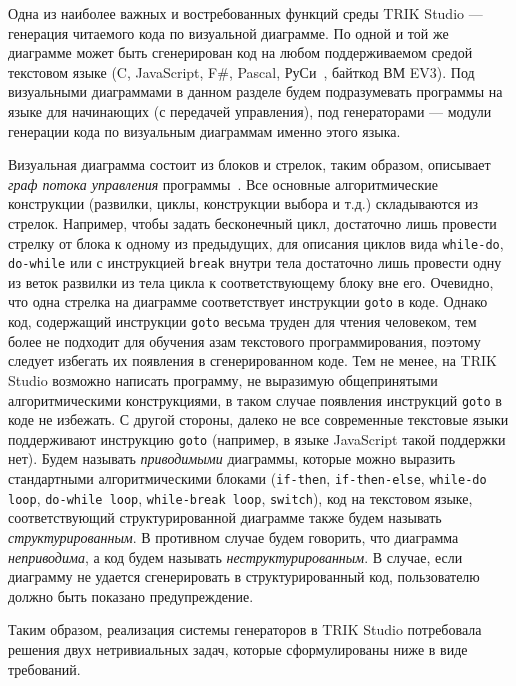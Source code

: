 \documentclass[a5paper]{article}
\begin{document}
Одна из наиболее важных и востребованных функций среды TRIK Studio --- генерация читаемого кода по визуальной диаграмме. По одной и той же диаграмме может быть сгенерирован код на любом поддерживаемом средой текстовом языке (C, JavaScript, F\#, Pascal, РуСи~\cite{тереховотечественные}, байткод ВМ EV3). Под визуальными диаграммами в данном разделе будем подразумевать программы на языке для начинающих (с передачей управления), под генераторами --- модули генерации кода по визуальным диаграммам именно этого языка.

Визуальная диаграмма состоит из блоков и стрелок, таким образом, описывает \textit{граф потока управления} программы~\cite{steven1997advanced}. Все основные алгоритмические конструкции (развилки, циклы, конструкции выбора и т.д.) складываются из стрелок. Например, чтобы задать бесконечный цикл, достаточно лишь провести стрелку от блока к одному из предыдущих, для описания циклов вида \texttt{while-do}, \texttt{do-while} или с инструкцией \texttt{break} внутри тела достаточно лишь провести одну из веток развилки из тела цикла к соответствующему блоку вне его. Очевидно, что одна стрелка на диаграмме соответствует инструкции \texttt{goto} в коде. Однако код, содержащий инструкции \texttt{goto} весьма труден для чтения человеком, тем более не подходит для обучения азам текстового программирования, поэтому следует избегать их появления в сгенерированном коде. Тем не менее, на TRIK Studio возможно написать программу, не выразимую общепринятыми алгоритмическими конструкциями, в таком случае появления инструкций \texttt{goto} в коде не избежать. С другой стороны, далеко не все современные текстовые языки поддерживают инструкцию \texttt{goto} (например, в языке JavaScript такой поддержки нет). Будем называть \textit{приводимыми} диаграммы, которые можно выразить стандартными алгоритмическими блоками (\texttt{if-then}, \texttt{if-then-else}, \texttt{while-do loop}, \texttt{do-while loop}, \texttt{while-break loop}, \texttt{switch}), код на текстовом языке, соответствующий структурированной диаграмме также будем называть \textit{структурированным}. В противном случае будем говорить, что диаграмма \textit{неприводима}, а код будем называть \textit{неструктурированным}. В случае, если диаграмму не удается сгенерировать в структурированный код, пользователю должно быть показано предупреждение.

Таким образом, реализация системы генераторов в TRIK Studio потребовала решения двух нетривиальных задач, которые сформулированы ниже в виде требований.
\end{document}
